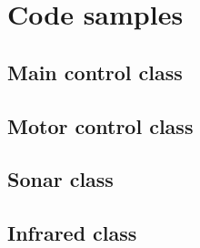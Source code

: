 \chapter{Code samples}

\section{Main control class}



\section{Motor control class}


\section{Sonar class}


\section{Infrared class}

